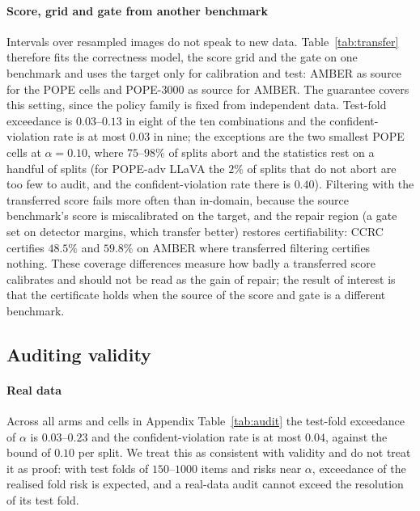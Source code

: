 \paragraph{Score, grid and gate from another benchmark}
Intervals over resampled images do not speak to new data. Table~\ref{tab:transfer} therefore fits the correctness model, the score grid and the gate on one benchmark and uses
the target only for calibration and test: AMBER as source for the POPE cells and POPE-3000 as source for AMBER. The guarantee covers this setting, since
the policy family is fixed from independent data. Test-fold exceedance is $0.03$--$0.13$ in eight of the ten combinations and the confident-violation rate is at most $0.03$ in nine; the exceptions are the two smallest POPE cells at $\alpha=0.10$, where $75$--$98\%$ of splits abort and the statistics rest on a handful
of splits (for POPE-adv LLaVA the $2\%$ of splits that do not abort are too few to audit, and the confident-violation rate there is $0.40$). Filtering with the
transferred score fails more often than in-domain, because the source benchmark's score is miscalibrated on the target, and the repair region (a gate set on
detector margins, which transfer better) restores certifiability: CCRC certifies $48.5\%$ and $59.8\%$ on AMBER where transferred filtering certifies nothing. These coverage differences measure how badly a transferred score calibrates and
should not be read as the gain of repair; the result of interest is that the certificate holds when the source of the score and gate is a different benchmark.

\begin{table}[t]
\centering
\caption{Held-out benchmark. Score model, score grid and gate are fitted on the source benchmark; calibration and test folds come from the target. In-domain CCRC
is the size-matched external-gate result of Table~\ref{tab:main}. exc: test-fold exceedance of $\alpha$; cv: confident-violation rate.}
\label{tab:transfer}
\small
\resizebox{\textwidth}{!}{}
\end{table}

\subsection{Auditing validity}
\label{sec:validity-audit}

\paragraph{Real data}
Across all arms and cells in Appendix Table~\ref{tab:audit} the test-fold exceedance of $\alpha$ is $0.03$--$0.23$ and the
confident-violation rate is at most $0.04$, against the bound of $0.10$ per split. We treat this as consistent with
validity and do not treat it as proof: with test folds of $150$--$1000$ items and risks near $\alpha$, exceedance of the
realised fold risk is expected, and a real-data audit cannot exceed the resolution of its test fold.

